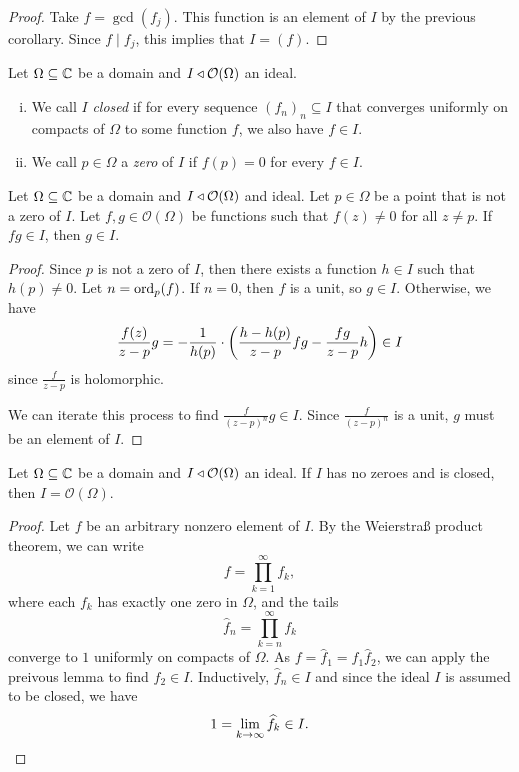 \begin{proof}
Take $f = \gcd(f_j)$. This function is an element of $I$ by the
previous corollary. Since $f \mid f_j$, this implies that
$I = (f)$.
\end{proof}

\begin{definicija}
Let $\Omega \subseteq \mathbb{C}$ be a domain and
$I \triangleleft \mathcal{O}(\Omega)$ an ideal.

\begin{enumerate}[i)]
\item We call $I$ \emph{closed} if for every
sequence $(f_n)_n \subseteq I$ that converges uniformly on compacts
of $\Omega$ to some function $f$, we also have $f \in I$.
\item We call $p \in \Omega$ a \emph{zero} of $I$ if
$f(p) = 0$ for every $f \in I$.
\end{enumerate}
\end{definicija}

\begin{lema}
Let $\Omega \subseteq \mathbb{C}$ be a domain and
$I \triangleleft \mathcal{O}(\Omega)$ and ideal. Let $p \in \Omega$ be a
point that is not a zero of $I$. Let
$f, g \in \mathcal{O}(\Omega)$ be functions such that $f(z) \ne 0$
for all $z \ne p$. If $f g \in I$, then $g \in I$.
\end{lema}

\begin{proof}
Since $p$ is not a zero of $I$, then there exists a function
$h \in I$ such that $h(p) \ne 0$. Let $n = \operatorname{ord}_p(f)$. If $n=0$,
then $f$ is a unit, so $g \in I$. Otherwise, we have
\[
\frac{f(z)}{z - p}g =
-\frac{1}{h(p)} \cdot
\left(\frac{h - h(p)}{z - p} fg - \frac{f g}{z - p} h\right) \in I
\]
since $\frac{f}{z - p}$ is holomorphic.
    
We can iterate this process to find $\frac{f}{(z - p)^n} g \in I$.
Since $\frac{f}{(z - p)^n}$ is a unit, $g$ must be an element of
$I$.
\end{proof}

\begin{izrek}
Let $\Omega \subseteq \mathbb{C}$ be a domain and
$I \triangleleft \mathcal{O}(\Omega)$ an ideal. If $I$ has no zeroes and is
closed, then $I = \mathcal{O}(\Omega)$.
\end{izrek}

\begin{proof}
Let $f$ be an arbitrary nonzero element of $I$. By the Weierstraß
product theorem, we can write
\[
f = \prod_{k = 1}^{\infty} f_k,
\]
where each $f_k$ has exactly one zero in $\Omega$, and the tails
\[
\widehat{f}_n = \prod_{k = n}^{\infty} f_k
\]
converge to $1$ uniformly on compacts of $\Omega$. As
$f = \widehat{f}_1 = f_1 \widehat{f}_2$, we can apply the preivous
lemma to find $\widehat{f}_2 \in I$. Inductively,
$\widehat{f}_n \in I$ and since the ideal $I$ is assumed to be
closed, we have
\[
1 = \lim_{k \to \infty} \widehat{f}_k \in I. \qedhere
\]
\end{proof}


